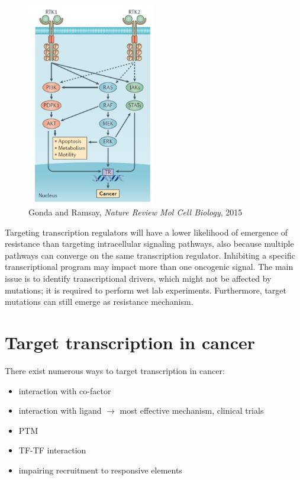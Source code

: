 \begin{figure}
\centering
\includegraphics[width=0.5\textwidth]{../_resources/Screen_Shot_2022-11-04_at_11-51-12.png}
\caption{Gonda and Ramsay, \emph{Nature Review Mol Cell Biology}, 2015}
\end{figure}


Targeting transcription regulators will have a lower likelihood of emergence of resistance than targeting intracellular signaling pathways, also because multiple pathways can converge on the same transcription regulator. Inhibiting a specific transcriptional program may impact more than one oncogenic signal. The main issue is to identify transcriptional drivers, which might not be affected by mutations; it is required to perform wet lab experiments. Furthermore, target mutations can still emerge as resistance mechanism.

\hypertarget{target-transcription-in-cancer}{%
\section{Target transcription in cancer}\label{target-transcription-in-cancer}}

There exist numerous ways to target transcription in cancer:

\begin{itemize}
\tightlist
\item
  interaction with co-factor
\item
  interaction with ligand $\rightarrow$ most effective mechanism, clinical trials
\item
  PTM
\item
  TF-TF interaction
\item
  impairing recruitment to responsive elements
\end{itemize}

